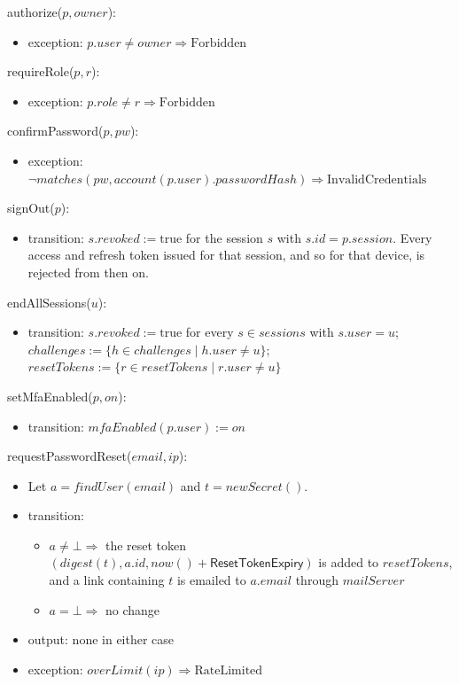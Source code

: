 \documentclass[12pt, titlepage]{article}
\begin{document}
\noindent authorize($p, \mathit{owner}$):
\begin{itemize}
\item exception: $p.\mathit{user} \neq \mathit{owner} \Rightarrow
  \mathrm{Forbidden}$
\end{itemize}

\noindent requireRole($p, r$):
\begin{itemize}
\item exception: $p.\mathit{role} \neq r \Rightarrow \mathrm{Forbidden}$
\end{itemize}

\noindent confirmPassword($p, \mathit{pw}$):
\begin{itemize}
\item exception: $\neg \mathit{matches}(\mathit{pw},
  \mathit{account}(p.\mathit{user}).\mathit{passwordHash}) \Rightarrow
  \mathrm{InvalidCredentials}$
\end{itemize}

\noindent signOut($p$):
\begin{itemize}
\item transition: $s.\mathit{revoked} := \mathrm{true}$ for the session $s$
  with $s.\mathit{id} = p.\mathit{session}$. Every access and refresh token
  issued for that session, and so for that device, is rejected from then on.
\end{itemize}

\noindent endAllSessions($u$):
\begin{itemize}
\item transition: $s.\mathit{revoked} := \mathrm{true}$ for every $s \in
  \mathit{sessions}$ with $s.\mathit{user} = u$; $\mathit{challenges} :=
  \{h \in \mathit{challenges} \mid h.\mathit{user} \neq u\}$;
  $\mathit{resetTokens} := \{r \in \mathit{resetTokens} \mid r.\mathit{user}
  \neq u\}$
\end{itemize}

\noindent setMfaEnabled($p, \mathit{on}$):
\begin{itemize}
\item transition: $\mathit{mfaEnabled}(p.\mathit{user}) := \mathit{on}$
\end{itemize}

\noindent requestPasswordReset($\mathit{email}, \mathit{ip}$):
\begin{itemize}
\item Let $a = \mathit{findUser}(\mathit{email})$ and $t =
  \mathit{newSecret}()$.
\item transition:
  \begin{itemize}
  \item $a \neq \bot \Rightarrow$ the reset token $(\mathit{digest}(t),
    a.\mathit{id}, \mathit{now}() + \textsf{ResetTokenExpiry})$ is added to
    $\mathit{resetTokens}$, and a link containing $t$ is emailed to
    $a.\mathit{email}$ through $\mathit{mailServer}$
  \item $a = \bot \Rightarrow$ no change
  \end{itemize}
\item output: none in either case
\item exception: $\mathit{overLimit}(\mathit{ip}) \Rightarrow
  \mathrm{RateLimited}$
\end{itemize}
\end{document}
